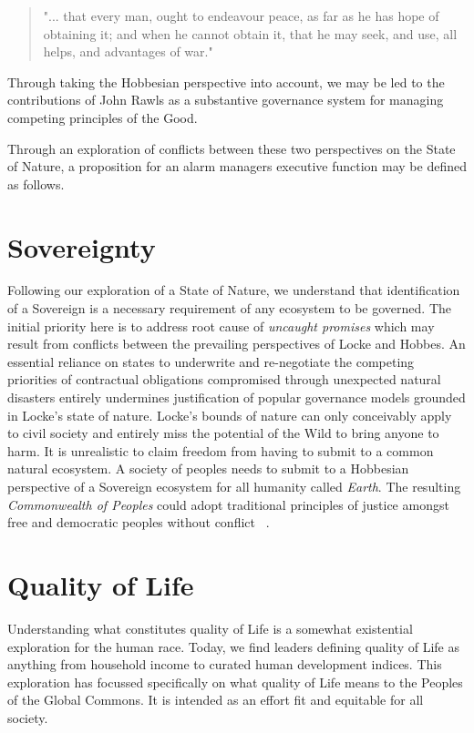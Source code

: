 \documentclass[11pt, oneside]{book}   	%
\begin{document}
\begin{quote}
"... that every man, ought to endeavour peace, as far as he has hope of obtaining it; and when he cannot obtain it, that he may seek, and use, all helps, and advantages of war."
\end{quote}
Through taking the Hobbesian perspective into account, we may be led to the contributions of John Rawls as a substantive governance system for managing competing principles of the Good.\

Through an exploration of conflicts between these two perspectives on the State of Nature, a proposition for an alarm managers executive function may be defined as follows.\

\pagebreak

\section{Sovereignty}
Following our exploration of a State of Nature, we understand that identification of a Sovereign is a necessary requirement of any ecosystem to be governed.
The initial priority here is to address root cause of \emph{uncaught promises} which may result from conflicts between the prevailing perspectives of Locke and Hobbes.
An essential reliance on states to underwrite and re-negotiate the competing priorities of contractual obligations compromised through unexpected natural disasters entirely undermines justification of popular governance models grounded in Locke's state of nature.
Locke's bounds of nature can only conceivably apply to civil society and entirely miss the potential of the Wild to bring anyone to harm.
It is unrealistic to claim freedom from having to submit to a common natural ecosystem.
A society of peoples needs to submit to a Hobbesian perspective of a Sovereign ecosystem for all humanity called \emph{Earth}.
The resulting \emph{Commonwealth of Peoples} could adopt traditional principles of justice amongst free and democratic peoples without conflict ~\cite{jr2}.\

\section{Quality of Life}
Understanding what constitutes quality of Life is a somewhat existential exploration for the human race.
Today, we find leaders defining quality of Life as anything from household income to curated human development indices.
This exploration has focussed specifically on what quality of Life means to the Peoples of the Global Commons.
It is intended as an effort fit and equitable for all society.
\end{document}
